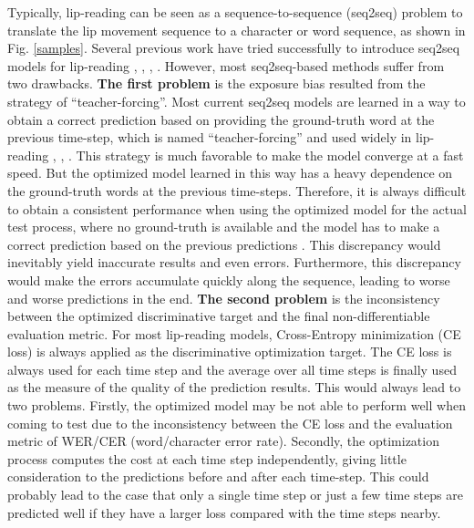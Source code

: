 \documentclass[a4paper, 10pt, conference]{ieeeconf}      \usepackage{FG2020}
\begin{document}
Typically, lip-reading can be seen as a sequence-to-sequence (seq2seq) problem to translate the lip movement sequence to a character or word sequence, as shown in Fig. \ref{samples}. Several previous work have tried successfully to introduce seq2seq models for lip-reading \cite{Afouras2018}, \cite{Chung}, \cite{Afouras2017}, \cite{Chung2017}. 
However, most seq2seq-based methods suffer from two drawbacks. 
\textbf{The first problem} is the exposure bias resulted from the strategy of ``teacher-forcing''. Most current seq2seq models are learned in a way to obtain a correct prediction based on providing the ground-truth word at the previous time-step, which is named ``teacher-forcing” \cite{Rennie} and used widely in lip-reading \cite{Chung2017}, \cite{Chung}, \cite{Afouras2018}. This strategy is much favorable to make the model converge at a fast speed. But the optimized model learned in this way has a heavy dependence on the ground-truth words at the previous time-steps. Therefore, it is always difficult to obtain a consistent performance when using the optimized model for the actual test process, where no ground-truth is available and the model has to make a correct prediction based on the previous predictions \cite{Chopra2016}. This discrepancy would inevitably yield inaccurate results and even errors. Furthermore, this discrepancy would make the errors accumulate quickly along the sequence, leading to worse and worse predictions in the end. 
\textbf{The second problem} is the inconsistency between the optimized discriminative target and the final non-differentiable evaluation metric. For most lip-reading models, Cross-Entropy minimization (CE loss) is always applied as the discriminative optimization target. The CE loss is always used for each time step and the average over all time steps is finally used as the measure of the quality of the prediction results. This would always lead to two problems. Firstly, the optimized model may be not able to perform well when coming to test due to the inconsistency between the CE loss and the evaluation metric of WER/CER (word/character error rate). Secondly, the optimization process computes the cost at each time step independently, giving little consideration to the predictions before and after each time-step. This could probably lead to the case that only a single time step or just a few time steps are predicted well if they have a larger loss compared with the time steps nearby.
	
\end{document}
